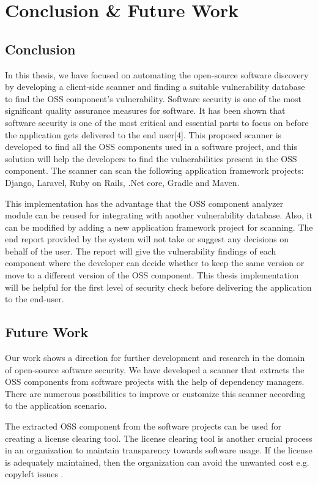 %
\section{Conclusion \& Future Work}\label{sec:conclusion}

\subsection{Conclusion}
In this thesis, we have focused on automating the open-source software discovery by developing a client-side scanner and finding a suitable vulnerability database to find the \acs{OSS} component’s vulnerability. Software security is one of the most significant quality assurance measures for software. It has been shown that software security is one of the most critical and essential parts to focus on before the application gets delivered to the end user[4]. This proposed scanner is developed to find all the OSS components used in a software project, and this solution will help the developers to find the vulnerabilities present in the \acs{OSS} component. The scanner can scan the following application framework projects: Django, Laravel, Ruby on Rails, .Net core, Gradle and Maven.

This implementation has the advantage that the \acs{OSS} component analyzer module can be reused for integrating with another vulnerability database. Also, it can be modified by adding a new application framework project for scanning. The end report provided by the system will not take or suggest any decisions on behalf of the user. The report will give the vulnerability findings of each component where the developer can decide whether to keep the same version or move to a different version of the \acs{OSS} component. This thesis implementation will be helpful for the first level of security check before delivering the application to the end-user.

\subsection{Future Work}
Our work shows a direction for further development and research in the domain of open-source software security. We have developed a scanner that extracts the \acs{OSS} components from software projects with the help of dependency managers. There are numerous
possibilities to improve or customize this scanner according to the application scenario.

The extracted \acs{OSS} component from the software projects can be used for creating a license clearing tool. The license clearing tool is another crucial process in an organization to maintain transparency towards software usage. If the license is adequately maintained, then the organization can avoid the unwanted cost e.g. copyleft issues \cite{copyleft}.

